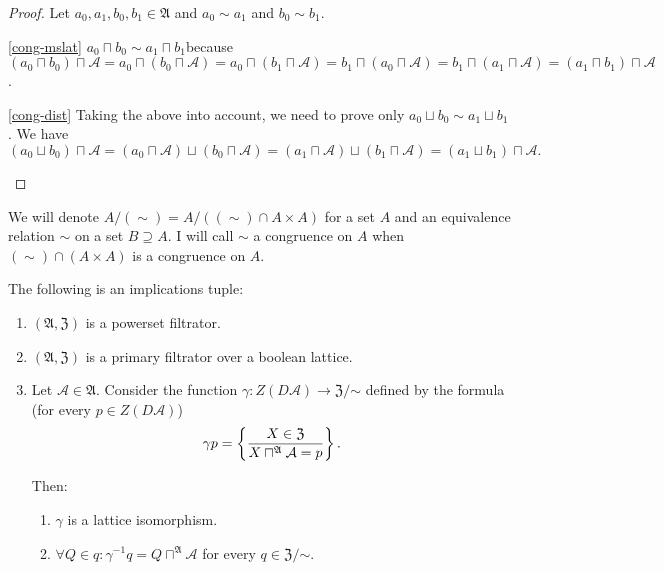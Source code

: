 \begin{proof}
Let $a_{0},a_{1},b_{0},b_{1}\in\mathfrak{A}$ and $a_{0}\sim a_{1}$
and $b_{0}\sim b_{1}$.
\begin{disorder}
\item [{\ref{cong-mslat}}] $a_{0}\sqcap b_{0}\sim a_{1}\sqcap b_{1}$because
$(a_{0}\sqcap b_{0})\sqcap\mathcal{A}=a_{0}\sqcap(b_{0}\sqcap\mathcal{A})=a_{0}\sqcap(b_{1}\sqcap\mathcal{A})=b_{1}\sqcap(a_{0}\sqcap\mathcal{A})=b_{1}\sqcap(a_{1}\sqcap\mathcal{A})=(a_{1}\sqcap b_{1})\sqcap\mathcal{A}$.
\item [{\ref{cong-dist}}] Taking the above into account, we need to prove
only $a_{0}\sqcup b_{0}\sim a_{1}\sqcup b_{1}$. We have
\[
(a_{0}\sqcup b_{0})\sqcap\mathcal{A}=(a_{0}\sqcap\mathcal{A})\sqcup(b_{0}\sqcap\mathcal{A})=(a_{1}\sqcap\mathcal{A})\sqcup(b_{1}\sqcap\mathcal{A})=(a_{1}\sqcup b_{1})\sqcap\mathcal{A}.
\]

\end{disorder}
\end{proof}
\begin{defn}
We will denote $A/(\sim)=A/((\sim)\cap A\times A)$ for a set $A$
and an equivalence relation $\sim$ on a set $B\supseteq A$. I will
call $\sim$ a congruence on $A$ when $(\sim)\cap(A\times A)$
is a congruence on $A$.\end{defn}
\begin{thm}
\label{factor-isomor}The following is an implications tuple:
\begin{enumerate}
\item \label{factor-isomor-p}$(\mathfrak{A},\mathfrak{Z})$ is a powerset
filtrator.
\item \label{factor-isomor-fltr}$(\mathfrak{A},\mathfrak{Z})$ is a primary
filtrator over a boolean lattice.
\item \label{factor-isomor-conc}Let $\mathcal{A}\in\mathfrak{A}$. Consider the function
$\gamma:Z(D\mathcal{A})\rightarrow\mathfrak{Z}/\mathord\sim$ defined
by the formula (for every $p\in Z(D\mathcal{A})$)
\[
\gamma p=\left\{ \frac{X\in\mathfrak{Z}}{X\sqcap^{\mathfrak{A}}\mathcal{A}=p}\right\}.
\]



Then:
\begin{enumerate}
\item $\gamma$ is a lattice isomorphism.
\item $\forall Q\in q:\gamma^{-1}q=Q\sqcap^{\mathfrak{A}}\mathcal{A}$ for
every $q\in\mathfrak{Z}/\mathord\sim$.
\end{enumerate}
\end{enumerate}
\end{thm}
